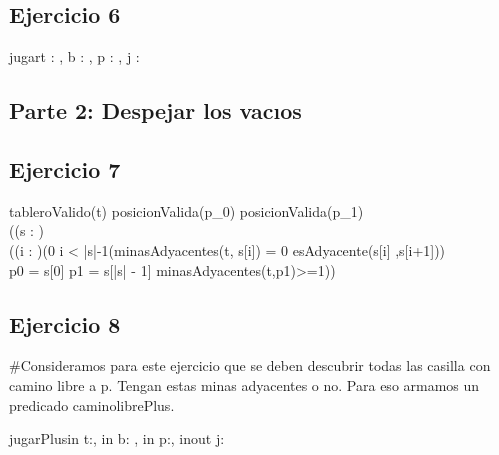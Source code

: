 \documentclass[a4paper]{article}
\begin{document}
\subsection*{Ejercicio 6}
\begin{proc}{jugar}{\In t : \tablero , \In b : \banderitas, \In p : \pos , \Inout j : \jugadas}{}
\end{proc}





\subsection*{Parte 2: Despejar los vacıos}

\subsection*{Ejercicio 7}


{ tableroValido(t) \y posicionValida(p_{0}) \y posicionValida(p_{1})\y \\
((\exists s : \TLista{\pos}) \\ 
((\forall i : \ent)(0 \leq i < |s|-1\implicaLuego (minasAdyacentes(t, s[i]) = 0 \y esAdyacente(s[i] ,s[i+1])) \\
\yLuego p0 = s[0] \y p1 = s[|s| - 1] \y minasAdyacentes(t,p1)>=1))}

\subsection*{Ejercicio 8}

#Consideramos para este ejercicio que se deben descubrir todas las casilla con camino libre a p. Tengan estas minas adyacentes o no.
Para eso armamos un predicado caminolibrePlus.

\begin{proc}{jugarPlus}{in t:\tablero, in b: \banderitas, in p:\pos, inout j: \jugadas}{}

\end{proc}
\end{document}
